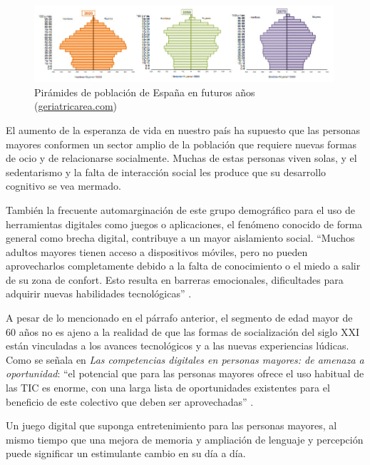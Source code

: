 \begin{figure}[ht]
    \centering
    \includegraphics[width=0.99\textwidth]{imgs/piramide-poblacion.jpg}
    \caption{Pirámides de población de España en futuros años (\href{https://www.geriatricarea.com/2020/09/25/uno-de-cada-tres-espanoles-tendra-65-o-mas-anos-en-el-2050/}{geriatricarea.com})}
    \label{fig:piramide-poblacion}
\end{figure}

El aumento de la esperanza de vida en nuestro país ha supuesto que las personas mayores conformen un sector amplio de la población que requiere nuevas formas de ocio y de relacionarse socialmente. Muchas de estas personas viven solas, y el sedentarismo y la falta de interacción social les produce que su desarrollo cognitivo se vea mermado.

También la frecuente automarginación de este grupo demográfico para el uso de herramientas digitales como juegos o aplicaciones, el fenómeno conocido de forma general como brecha digital, contribuye a un mayor aislamiento social. \enquote{Muchos adultos mayores tienen acceso a dispositivos móviles, pero no pueden aprovecharlos completamente debido a la falta de conocimiento o el miedo a salir de su zona de confort. Esto resulta en barreras emocionales, dificultades para adquirir nuevas habilidades tecnológicas} \parencite{intro1}. 

A pesar de lo mencionado en el párrafo anterior, el segmento de edad mayor de 60 años no es ajeno a la realidad de que las formas de socialización del siglo XXI están vinculadas a los avances tecnológicos y a las nuevas experiencias lúdicas. Como se señala en \textit{Las competencias digitales en personas mayores: de amenaza a oportunidad}: \enquote{el potencial que para las personas mayores ofrece el uso habitual de las TIC es enorme, con una larga lista de oportunidades existentes para el beneficio de este colectivo que deben ser aprovechadas} \parencite{intro4}.

Un juego digital que suponga entretenimiento para las personas mayores, al mismo tiempo que una mejora de memoria y ampliación de lenguaje y percepción puede significar un estimulante cambio en su día a día. 

